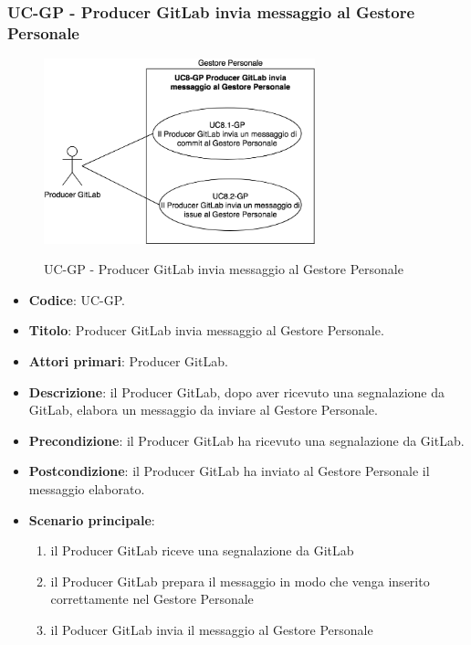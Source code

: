 \subsubsection{UC\theuccount-GP - Producer GitLab invia messaggio al Gestore Personale}
	\begin{figure}[H]
		\centering
		\includegraphics[width=0.7\textwidth]{img/casi_d'uso/UC8.png}\\
		\caption{UC\theuccount-GP - Producer GitLab invia messaggio al Gestore Personale}
	\end{figure}
	\begin{itemize}
		\item \textbf{Codice}: UC\theuccount-GP.
		\item \textbf{Titolo}: Producer GitLab invia messaggio al Gestore Personale.
		\item \textbf{Attori primari}: Producer GitLab.
		\item \textbf{Descrizione}: il Producer GitLab, dopo aver ricevuto una segnalazione da GitLab, elabora un messaggio da inviare al Gestore Personale.
		\item \textbf{Precondizione}: il Producer GitLab ha ricevuto una segnalazione da GitLab.
		\item \textbf{Postcondizione}: il Producer GitLab ha inviato al Gestore Personale il messaggio  \newline elaborato.
		\item \textbf{Scenario principale}: 
		\begin{enumerate}
			\item il Producer GitLab riceve una segnalazione da GitLab
			\item il Producer GitLab prepara il messaggio in modo che venga inserito correttamente nel Gestore Personale
			\item il Poducer GitLab invia il messaggio al Gestore Personale
		\end{enumerate}
		
	\end{itemize}
	\newpage
